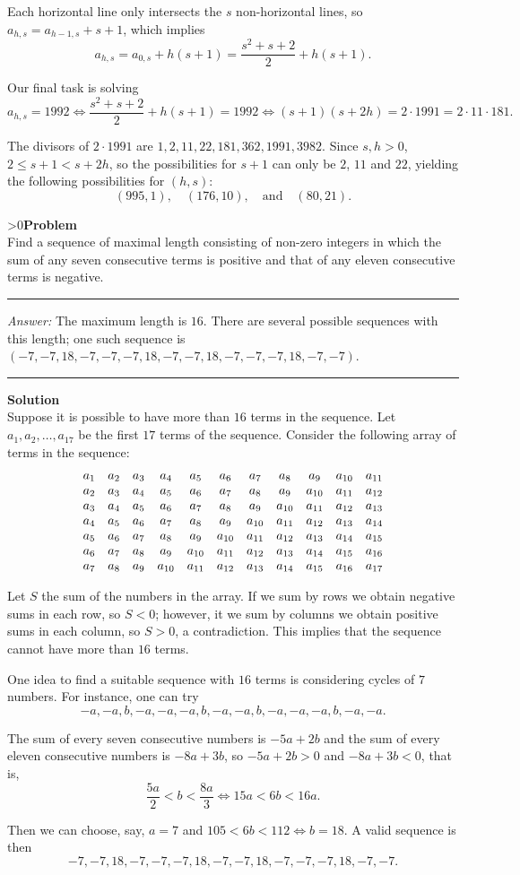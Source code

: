 \documentclass[12pt,oneside,a4paper]{book}
\newcounter{probnum}
\newcounter{solnum}
\newcommand{\prob}{\ifnum\value{probnum}>0\newpage\fi\setcounter{solnum}{0}\stepcounter{probnum}\textbf{Problem \theprobnum}\\}
\newcommand{\ans}{\medskip\hrule\medbreak\emph{Answer: }}
\newcommand{\sol}{\medskip\hrule\medbreak\textbf{Solution}\\}
\begin{document}
Each horizontal line only intersects the $s$ non-horizontal lines, so $a_{h,s} = a_{h-1,s} + s+1$, which implies
\[a_{h,s} = a_{0,s} + h(s+1) = \frac{s^2+s+2}2 + h(s+1).\]

Our final task is solving
\[a_{h,s} = 1992\iff \frac{s^2+s+2}2 + h(s+1) = 1992 \iff (s+1)(s+2h) = 2\cdot 1991 = 2\cdot 11\cdot 181.\]

The divisors of $2\cdot 1991$ are $1,2,11,22,181,362,1991,3982$. Since $s,h>0$, $2\le s+1<s+2h$, so the possibilities for $s+1$ can only be $2$, $11$ and $22$, yielding the following possibilities for $(h,s)$:
\[(995,1),\quad (176,10),\quad\text{and}\quad (80,21).\]

\prob Find a sequence of maximal length consisting of non-zero integers in which the sum of any seven consecutive terms is positive and that of any eleven consecutive terms is negative.

\ans The maximum length is $16$. There are several possible sequences with this length; one such sequence is $(-7,-7,18,-7,-7,-7,18,-7,-7,18,-7,-7,-7,18,-7,-7)$.

\sol
Suppose it is possible to have more than $16$ terms in the sequence. Let $a_1,a_2,\ldots,a_{17}$ be the first $17$ terms of the sequence. Consider the following array of terms in the sequence:
\[\setcounter{MaxMatrixCols}{11}
\begin{matrix}
a_1& a_2& a_3& a_4& a_5& a_6& a_7& a_8& a_9& a_{10}& a_{11}\\
a_2& a_3& a_4& a_5& a_6& a_7& a_8& a_9& a_{10}& a_{11}& a_{12}\\
a_3& a_4& a_5& a_6& a_7& a_8& a_9& a_{10}& a_{11}& a_{12}& a_{13}\\
a_4& a_5& a_6& a_7& a_8& a_9& a_{10}& a_{11}& a_{12}& a_{13}& a_{14}\\
a_5& a_6& a_7& a_8& a_9& a_{10}& a_{11}& a_{12}& a_{13}& a_{14}& a_{15}\\
a_6& a_7& a_8& a_9& a_{10}& a_{11}& a_{12}& a_{13}& a_{14}& a_{15}& a_{16}\\
a_7& a_8& a_9& a_{10}& a_{11}& a_{12}& a_{13}& a_{14}& a_{15}& a_{16}& a_{17}
\end{matrix}\]

Let $S$ the sum of the numbers in the array. If we sum by rows we obtain negative sums in each row, so $S<0$; however, it we sum by columns we obtain positive sums in each column, so $S>0$, a contradiction. This implies that the sequence cannot have more than $16$ terms.

One idea to find a suitable sequence with $16$ terms is considering cycles of $7$ numbers. For instance, one can try
\[-a,-a,b,-a,-a,-a,b, -a,-a,b,-a,-a,-a,b, -a,-a.\]

The sum of every seven consecutive numbers is $-5a+2b$ and the sum of every eleven consecutive numbers is $-8a+3b$, so $-5a+2b > 0$ and $-8a+3b < 0$, that is,
\[\frac{5a}2 < b < \frac{8a}3\iff 15a < 6b < 16a.\]

Then we can choose, say, $a=7$ and $105 < 6b < 112\iff b = 18$. A valid sequence is then
\[-7,-7,18,-7,-7,-7,18,-7,-7,18,-7,-7,-7,18,-7,-7.\]
\end{document}
